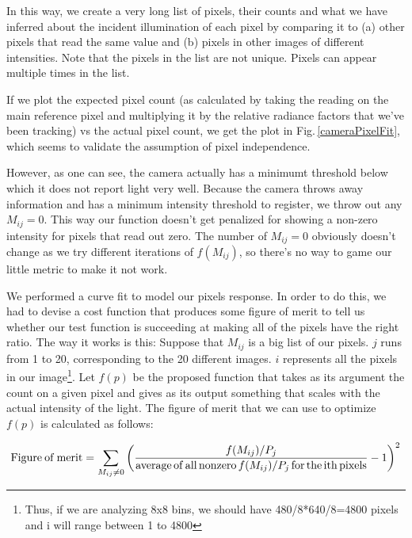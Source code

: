In this way, we create a very long list of pixels, their counts and what we have inferred about the incident illumination of each pixel by comparing it to (a) other pixels that read the same value and (b) pixels in other images of different intensities. Note that the pixels in the list are not unique. Pixels can appear multiple times in the list.

If we plot the expected pixel count (as calculated by taking the reading on the main reference pixel and multiplying it by the relative radiance factors that we've been tracking) vs the actual pixel count, we get the plot in Fig.\,\ref{cameraPixelFit}, which seems to validate the assumption of pixel independence.

However, as one can see, the camera actually has a minimumt threshold below which it does not report light very well. Because the camera throws away information and has a minimum intensity threshold to register, we throw out any $M_{i j}=0$. This way our function doesn't get penalized for showing a non-zero intensity for pixels that read out zero. The number of $M_{i j}=0$ obviously doesn't change as we try different iterations of $f(M_{ij})$, so there's no way to game our little metric to make it not work.

We performed a curve fit to model our pixels response. In order to do this, we had to devise a cost function that produces some figure of merit to tell us whether our test function is succeeding at making all of the pixels have the right ratio. The way it works is this: Suppose that $M_{i j}$ is a big list of our pixels. $j$ runs from 1 to 20, corresponding to the 20 different images. $i$ represents all the pixels in our image\footnote{Thus, if we are analyzing 8x8 bins, we should have 480/8*640/8=4800 pixels and i will range between 1 to 4800}. Let $f(p)$ be the proposed function that takes as its argument the count on a given pixel and gives as its output something that scales with the actual intensity of the light. The figure of merit that we can use to optimize $f(p)$ is calculated as follows: 

\begin{equation}\label{fom}
{\rm Figure\:of\:merit}=\sum_{ M_{i j}\neq 0}\left(\frac{f(M_{i j})/P_j}{{\rm average\,of\,all\,nonzero\,} f(M_{i j})/P_j {\rm \,for\,the\,ith\,pixels}}-1\right)^2
\end{equation}


